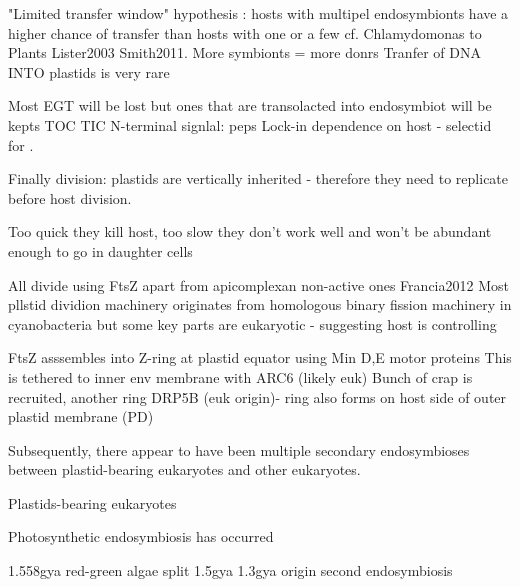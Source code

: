 "Limited transfer window" hypothesis : hosts with multipel endosymbionts have a higher chance of transfer than hosts 
with one or a few cf. Chlamydomonas to Plants Lister2003 Smith2011. More symbionts = more donrs 
Tranfer of DNA INTO plastids is very rare  

Most EGT will be lost but ones that are transolacted into endosymbiot will be kepts TOC TIC N-terminal signlal: peps
Lock-in dependence on host - selectid for .


Finally division: plastids are vertically inherited - therefore they need to replicate before host division.

Too quick they kill host, too slow they don't work well and won't be abundant enough to go in daughter cells


All divide using FtsZ apart from apicomplexan non-active ones Francia2012
Most pllstid dividion machinery originates from homologous binary fission machinery in cyanobacteria
but some key parts are eukaryotic - suggesting host is controlling 

FtsZ asssembles into Z-ring at plastid equator using Min D,E motor proteins 
This is tethered to inner env membrane with ARC6 (likely euk)
Bunch of crap is recruited, another ring DRP5B (euk origin)- ring also forms on host side of outer plastid membrane (PD)
\citep{McFadden2014}









Subsequently, there appear to have been multiple secondary endosymbioses between plastid-bearing eukaryotes
and other eukaryotes.






Plastids-bearing eukaryotes 






Photosynthetic endosymbiosis has occurred 




1.558gya 
red-green algae split 1.5gya
1.3gya origin second endosymbiosis \citep{Yoon2004}








